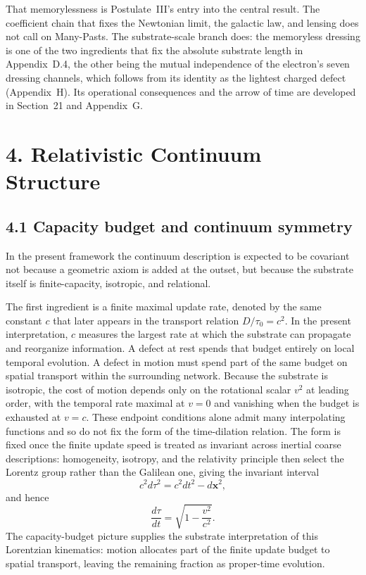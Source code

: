 \documentclass[11pt]{article}
\begin{document}
That memorylessness is Postulate~III's entry into the central result. The coefficient chain that fixes the Newtonian limit, the galactic law, and lensing does not call on Many-Pasts. The substrate-scale branch does: the memoryless dressing is one of the two ingredients that fix the absolute substrate length in Appendix~D.4, the other being the mutual independence of the electron's seven dressing channels, which follows from its identity as the lightest charged defect (Appendix~H). Its operational consequences and the arrow of time are developed in Section~21 and Appendix~G.

\section{4. Relativistic Continuum Structure}

\subsection{4.1 Capacity budget and continuum symmetry}

In the present framework the continuum description is expected to be covariant not because a geometric axiom is added at the outset, but because the substrate itself is finite-capacity, isotropic, and relational.

The first ingredient is a finite maximal update rate, denoted by the same constant $c$ that later appears in the transport relation $D/\tau_0=c^2$. In the present interpretation, $c$ measures the largest rate at which the substrate can propagate and reorganize information. A defect at rest spends that budget entirely on local temporal evolution. A defect in motion must spend part of the same budget on spatial transport within the surrounding network. Because the substrate is isotropic, the cost of motion depends only on the rotational scalar $v^2$ at leading order, with the temporal rate maximal at $v=0$ and vanishing when the budget is exhausted at $v=c$. These endpoint conditions alone admit many interpolating functions and so do not fix the form of the time-dilation relation. The form is fixed once the finite update speed is treated as invariant across inertial coarse descriptions: homogeneity, isotropy, and the relativity principle then select the Lorentz group rather than the Galilean one, giving the invariant interval
\[
c^2 d\tau^2 = c^2 dt^2 - d\mathbf{x}^2,
\]
and hence
\[
\frac{d\tau}{dt}=\sqrt{1-\frac{v^2}{c^2}}.
\]
The capacity-budget picture supplies the substrate interpretation of this Lorentzian kinematics: motion allocates part of the finite update budget to spatial transport, leaving the remaining fraction as proper-time evolution.
\end{document}
